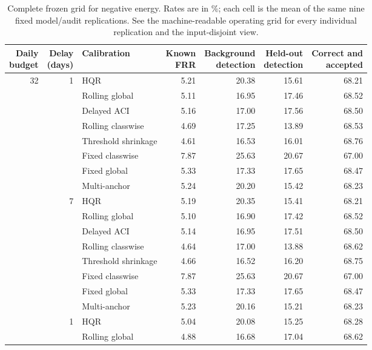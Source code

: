 \begin{table}[p]
\centering
\footnotesize
\caption{Complete frozen grid for negative energy. Rates are in \%; each cell is the mean of the same nine fixed model/audit replications. See the machine-readable operating grid for every individual replication and the input-disjoint view.}
\label{tab:grid-negative-energy}
\setlength{\tabcolsep}{3pt}
\begin{tabular}{rrlrrrr}
\toprule
\shortstack{Daily\\budget} & \shortstack{Delay\\(days)} & Calibration & \shortstack{Known\\FRR} & \shortstack{Background\\detection} & \shortstack{Held-out\\detection} & \shortstack{Correct and\\accepted} \\
\midrule
32 & 1 & HQR & 5.21 & 20.38 & 15.61 & 68.21 \\
 &  & Rolling global & 5.11 & 16.95 & 17.46 & 68.52 \\
 &  & Delayed ACI & 5.16 & 17.00 & 17.56 & 68.50 \\
 &  & Rolling classwise & 4.69 & 17.25 & 13.89 & 68.53 \\
 &  & Threshold shrinkage & 4.61 & 16.53 & 16.01 & 68.76 \\
 &  & Fixed classwise & 7.87 & 25.63 & 20.67 & 67.00 \\
 &  & Fixed global & 5.33 & 17.33 & 17.65 & 68.47 \\
 &  & Multi-anchor & 5.24 & 20.20 & 15.42 & 68.23 \\
\addlinespace
32 & 7 & HQR & 5.19 & 20.35 & 15.41 & 68.21 \\
 &  & Rolling global & 5.10 & 16.90 & 17.42 & 68.52 \\
 &  & Delayed ACI & 5.14 & 16.95 & 17.51 & 68.50 \\
 &  & Rolling classwise & 4.64 & 17.00 & 13.88 & 68.62 \\
 &  & Threshold shrinkage & 4.66 & 16.52 & 16.20 & 68.75 \\
 &  & Fixed classwise & 7.87 & 25.63 & 20.67 & 67.00 \\
 &  & Fixed global & 5.33 & 17.33 & 17.65 & 68.47 \\
 &  & Multi-anchor & 5.23 & 20.16 & 15.21 & 68.23 \\
\addlinespace
128 & 1 & HQR & 5.04 & 20.08 & 15.25 & 68.28 \\
 &  & Rolling global & 4.88 & 16.68 & 17.04 & 68.62 \\

\end{tabular}
\end{table}
